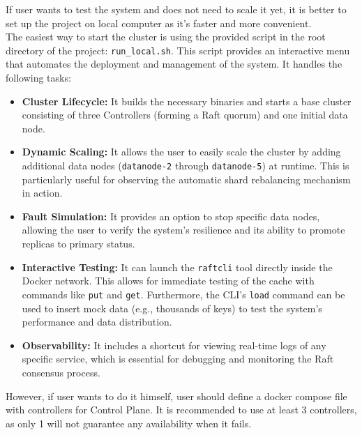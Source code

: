 \documentclass[shortabstract]{iithesis}
\begin{document}
If user wants to test the system and does not need to scale it yet, it is better to set up the project on local computer as it's faster and more convenient. \\
The easiest way to start the cluster is using the provided script in the root directory of the project: \texttt{run\_local.sh}. This script provides an interactive menu that automates the deployment and management of the system. It handles the following tasks:
\begin{itemize}
    \item \textbf{Cluster Lifecycle:} It builds the necessary binaries and starts a base cluster consisting of three Controllers (forming a Raft quorum) and one initial data node.
    \item \textbf{Dynamic Scaling:} It allows the user to easily scale the cluster by adding additional data nodes (\texttt{datanode-2} through \texttt{datanode-5}) at runtime. This is particularly useful for observing the automatic shard rebalancing mechanism in action.
    \item \textbf{Fault Simulation:} It provides an option to stop specific data nodes, allowing the user to verify the system's resilience and its ability to promote replicas to primary status.
    \item \textbf{Interactive Testing:} It can launch the \texttt{raftcli} tool directly inside the Docker network. This allows for immediate testing of the cache with commands like \texttt{put} and \texttt{get}. Furthermore, the CLI's \texttt{load} command can be used to insert mock data (e.g., thousands of keys) to test the system's performance and data distribution.
    \item \textbf{Observability:} It includes a shortcut for viewing real-time logs of any specific service, which is essential for debugging and monitoring the Raft consensus process.
\end{itemize}

However, if user wants to do it himself, user should define a docker compose file with controllers for Control Plane. It is recommended to use at least 3 controllers, as only 1 will not guarantee any availability when it fails. \\
\end{document}

